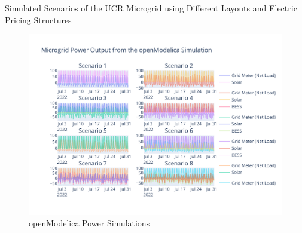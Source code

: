 \documentclass[conference]{IEEEtran}
\begin{document}
	     	\begin{table}[H]
	 	\caption{Simulated Scenarios of the UCR Microgrid using Different Layouts and Electric Pricing Structures}
	 	\tiny
	 	
	 	\normalsize
	 	\label{tab:scenarios}
	 \end{table}
	 
	 \begin{figure}
	 	\centering
	 	\includegraphics[width=0.9\linewidth]{Fig/scenario_subplot}
	 	\caption{openModelica Power Simulations}
	 	\label{fig:scenariosubplot}
	 \end{figure}
	
\end{document}

